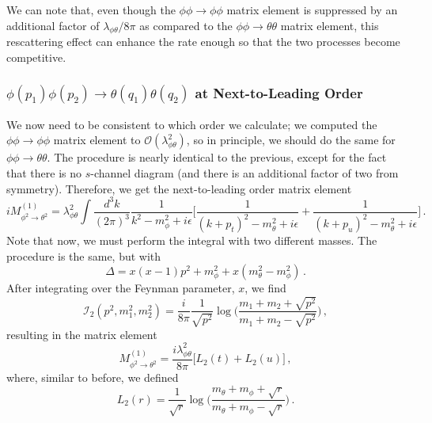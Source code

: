 \documentclass{article}
\numberwithin{equation}{subsection}
\begin{document}
We can note that, even though the $\phi\phi\to\phi\phi$ matrix element is suppressed by an additional factor of $\lambda_{\phi\theta}/8\pi$ as compared to the
$\phi\phi\to\theta\theta$ matrix element, this rescattering effect can enhance the rate enough so that the two processes become competitive.

\subsubsection{$\phi(p_1)\phi(p_2)\to \theta(q_1)\theta(q_2)$ at Next-to-Leading Order}

We now need to be consistent to which order we calculate; we computed the $\phi\phi\to\phi\phi$ matrix element to $\mathcal{O}(\lambda_{\phi\theta}^2)$, so in principle,
we should do the same for $\phi\phi\to\theta\theta$. The procedure is nearly identical to the previous, except for the fact that 
there is no $s$-channel diagram (and there is an additional factor of two from symmetry). Therefore, we get the next-to-leading order matrix element
\begin{equation}
	iM_{\phi^2\to\theta^2}^{(1)} = \lambda_{\phi\theta}^2\int\frac{d^3k}{(2\pi)^3}
		\frac{1}{k^2 - m_\phi^2 + i\epsilon}\Big[\frac{1}{(k + p_t)^2 - m_\theta^2 + i\epsilon} + \frac{1}{(k + p_u)^2 - m_\theta^2 + i\epsilon}\Big]\,.
\end{equation}
Note that now, we must perform the integral with two different masses. The procedure is the same, but with
\begin{equation}
	\Delta = x(x-1)p^2 + m_\phi^2 + x(m_\theta^2 - m_\phi^2)\,.
\end{equation}
After integrating over the Feynman parameter, $x$, we find
\begin{equation}
	\mathcal{I}_2(p^2, m_1^2, m_2^2) = \frac{i}{8\pi}\frac{1}{\sqrt{p^2}}\log\Big(\frac{m_1 + m_2 + \sqrt{p^2}}{m_1 + m_2 - \sqrt{p^2}}\Big)\,,
\end{equation}
resulting in the matrix element
\begin{equation}
	M_{\phi^2\to\theta^2}^{(1)} = \frac{i\lambda_{\phi\theta}^2}{8\pi}\big[L_2(t) + L_2(u)\big]\,,
\end{equation}
where, similar to before, we defined
\begin{equation}
	L_2(r) = \frac{1}{\sqrt{r}}\log\Big(\frac{m_\theta + m_\phi + \sqrt{r}}{m_\theta + m_\phi - \sqrt{r}}\Big)\,.
\end{equation}
\end{document}
